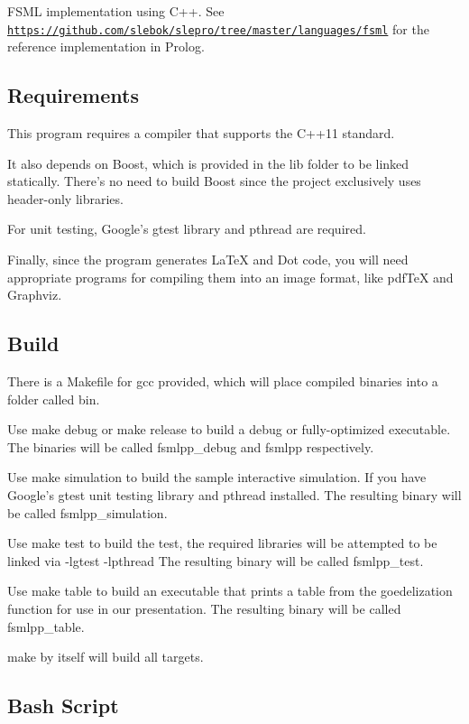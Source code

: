 F\-S\-M\-L implementation using C++. See \href{https://github.com/slebok/slepro/tree/master/languages/fsml}{\tt https\-://github.\-com/slebok/slepro/tree/master/languages/fsml} for the reference implementation in Prolog.

\subsection*{Requirements}

This program requires a compiler that supports the C++11 standard.

It also depends on Boost, which is provided in the lib folder to be linked statically. There's no need to build Boost since the project exclusively uses header-\/only libraries.

For unit testing, Google's gtest library and pthread are required.

Finally, since the program generates La\-Te\-X and Dot code, you will need appropriate programs for compiling them into an image format, like pdf\-Te\-X and Graphviz.

\subsection*{Build}

There is a Makefile for gcc provided, which will place compiled binaries into a folder called bin.

Use {\ttfamily make debug} or {\ttfamily make release} to build a debug or fully-\/optimized executable. The binaries will be called {\ttfamily fsmlpp\-\_\-debug} and {\ttfamily fsmlpp} respectively.

Use {\ttfamily make simulation} to build the sample interactive simulation. If you have Google's gtest unit testing library and pthread installed. The resulting binary will be called {\ttfamily fsmlpp\-\_\-simulation}.

Use {\ttfamily make test} to build the test, the required libraries will be attempted to be linked via {\ttfamily -\/lgtest -\/lpthread} The resulting binary will be called {\ttfamily fsmlpp\-\_\-test}.

Use {\ttfamily make table} to build an executable that prints a table from the goedelization function for use in our presentation. The resulting binary will be called {\ttfamily fsmlpp\-\_\-table}.

{\ttfamily make} by itself will build all targets.

\subsection*{Bash Script}

